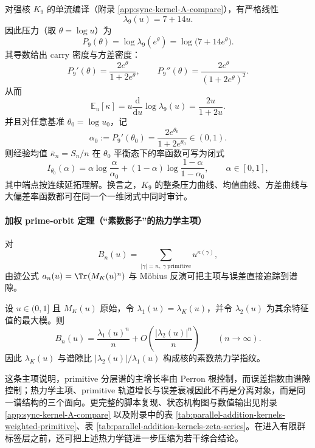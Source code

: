 \begin{corollary}\label{cor:k9-integrable-pressure-ldp}
对强核 \(K_9\) 的单流编译（附录 \ref{app:sync-kernel-A-compare}），有严格线性
\[
\lambda_9(u)=7+14u.
\]
因此压力（取 \(\theta=\log u\)）为
\[
P_9(\theta)=\log\lambda_9(e^\theta)=\log\!\bigl(7+14e^\theta\bigr).
\]
其导数给出 carry 密度与方差密度：
\[
P_9'(\theta)=\frac{2e^\theta}{1+2e^\theta},
\qquad
P_9''(\theta)=\frac{2e^\theta}{(1+2e^\theta)^2}.
\]
从而
\[
\mathbb{E}_{u}[\kappa]=u\frac{\mathrm{d}}{\mathrm{d}u}\log\lambda_9(u)=\frac{2u}{1+2u}.
\]
并且对任意基准 \(\theta_0=\log u_0\)，记
\[
\alpha_0:=P_9'(\theta_0)=\frac{2e^{\theta_0}}{1+2e^{\theta_0}}\in(0,1).
\]
则经验均值 \(\bar\kappa_n=S_n/n\) 在 \(\theta_0\) 平衡态下的率函数可写为闭式
\[
I_{\theta_0}(\alpha)
=\alpha\log\frac{\alpha}{\alpha_0}+(1-\alpha)\log\frac{1-\alpha}{1-\alpha_0},
\qquad \alpha\in[0,1],
\]
其中端点按连续延拓理解。换言之，\(K_9\) 的整条压力曲线、均值曲线、方差曲线与大偏差率函数都可在同一个一维闭式中同时审计。
\end{corollary}

\paragraph{加权 prime-orbit 定理（“素数影子”的热力学主项）}
对
\[
B_n(u)=\sum_{|\gamma|=n,\ \gamma\ \mathrm{primitive}}u^{\kappa(\gamma)},
\]
由迹公式 \(a_n(u)=\Tr(M_K(u)^n)\) 与 M\"obius 反演可把主项与误差直接追踪到谱隙。

\begin{theorem}\label{thm:kernel-weighted-prime-orbit}
设 \(u\in(0,1]\) 且 \(M_K(u)\) 原始，令 \(\lambda_1(u)=\lambda_K(u)\)，并令 \(\lambda_2(u)\) 为其余特征值的最大模。则
\[
B_n(u)=\frac{\lambda_1(u)^n}{n}+O\!\left(\frac{|\lambda_2(u)|^n}{n}\right)\qquad(n\to\infty).
\]
因此 \(\lambda_K(u)\) 与谱隙比 \( |\lambda_2(u)|/\lambda_1(u)\) 构成核的素数热力学指纹。
\end{theorem}

这条主项说明，primitive 分层谱的主增长率由 Perron 根控制，而误差指数由谱隙控制；热力学主项、primitive 轨道增长与误差衰减因此不再是分离对象，而是同一谱结构的三个面向。更完整的脚本复现、状态机构图与数值输出见附录 \ref{app:sync-kernel-A-compare} 以及附录中的表 \ref{tab:parallel-addition-kernels-weighted-primitive}、表 \ref{tab:parallel-addition-kernels-zeta-series}。在进入有限群标签层之前，还可把上述热力学链进一步压缩为若干综合结论。

